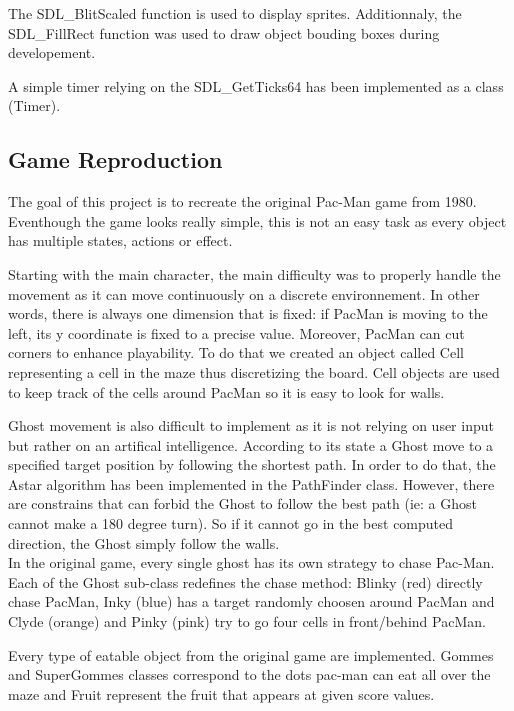 The \textsf{SDL\_BlitScaled} function is used to display sprites. Additionnaly, the \textsf{SDL\_FillRect} function was used to draw object bouding boxes during developement.

A simple timer relying on the \textsf{SDL\_GetTicks64} has been implemented as a class (\textsf{Timer}).

\subsection{Game Reproduction}
The goal of this project is to recreate the original Pac-Man game from 1980. Eventhough the game looks really simple, this is not an easy task as every object has multiple states, actions or effect.

Starting with the main character, the main difficulty was to properly handle the movement as it can move continuously on a discrete environnement. In other words, there is always one dimension that is fixed: if \textsf{PacMan} is moving to the left, its y coordinate is fixed to a precise value. Moreover, \textsf{PacMan} can cut corners to enhance playability. To do that we created an object called \textsf{Cell} representing a cell in the maze thus discretizing the board. \textsf{Cell} objects are used to keep track of the cells around \textsf{PacMan} so it is easy to look for walls.

\textsf{Ghost} movement is also difficult to implement as it is not relying on user input but rather on an artifical intelligence. According to its state a \textsf{Ghost} move to a specified target position by following the shortest path. In order to do that, the Astar algorithm has been implemented in the \textsf{PathFinder} class. However, there are constrains that can forbid the \textsf{Ghost} to follow the best path (ie: a \textsf{Ghost} cannot make a 180 degree turn). So if it cannot go in the best computed direction, the \textsf{Ghost} simply follow the walls.\\
In the original game, every single ghost has its own strategy to chase Pac-Man. Each of the \textsf{Ghost} sub-class redefines the \textsf{chase} method: \textsf{Blinky} (red) directly chase \textsf{PacMan}, \textsf{Inky} (blue) has a target randomly choosen around \textsf{PacMan} and \textsf{Clyde} (orange) and \textsf{Pinky} (pink) try to go four cells in front/behind \textsf{PacMan}.

Every type of eatable object from the original game are implemented. \textsf{Gommes} and \textsf{SuperGommes} classes correspond to the dots pac-man can eat all over the maze and \textsf{Fruit} represent the fruit that appears at given score values.


